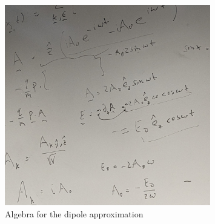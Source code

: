 \documentclass[12pt]{article}
\begin{document}
\begin{figure}
  \centering
  \includegraphics[width=0.8\textwidth]{PXL_20240216_204341590.jpg}
  \caption{Algebra for the dipole approximation}
\end{figure}
\end{document}
